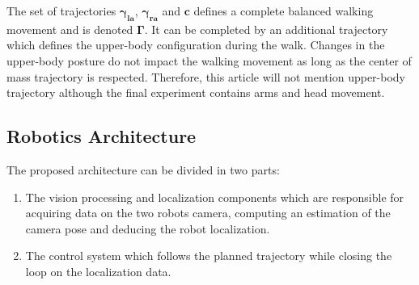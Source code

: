 The set of trajectories $\mathbf{\gamma_{\text{la}}}$,
$\mathbf{\gamma_{\text{ra}}}$ and $\mathbf{c}$ defines a complete
balanced walking movement and is denoted $\mathbf{\Gamma}$. It can be
completed by an additional trajectory which defines the upper-body
configuration during the walk. Changes in the upper-body posture do
not impact the walking movement as long as the center of mass
trajectory is respected. Therefore, this article will not mention
upper-body trajectory although the final experiment contains arms and
head movement.

\subsection{Robotics Architecture}

The proposed architecture can be divided in two parts:
\begin{enumerate}
\item The vision processing and localization components which are
  responsible for acquiring data on the two robots camera, computing
  an estimation of the camera pose and deducing the robot
  localization.
\item The control system which follows the planned trajectory while
  closing the loop on the localization data.
\end{enumerate}

